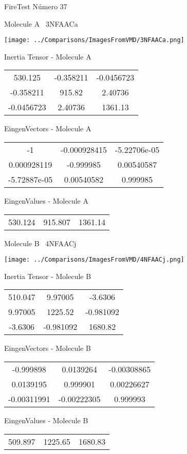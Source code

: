 \vtab[-3cm]
\begin{center}
{\large FireTest \tab Número 37}
\end{center}
\begin{multicols}{2}
\begin{center}

Molecule A \
3NFAACa

\texttt{[image: ../Comparisons/ImagesFromVMD/3NFAACa.png]}

Inertia Tensor - Molecule A \\
\begin{tabular}{|c c c|}
530.125	 & 	-0.358211	 & 	-0.0456723	 \\
-0.358211	 & 	915.82	 & 	2.40736	 \\
-0.0456723	 & 	2.40736	 & 	1361.13
\end{tabular}

\vtab
 EingenVectors - Molecule A     \\
\begin{tabular}{|c c c|}
-1	 & 	-0.000928415	 & 	-5.22706e-05	 \\
0.000928119	 & 	-0.999985	 & 	0.00540587	 \\
-5.72887e-05	 & 	0.00540582	 & 	0.999985
\end{tabular}

\vtab
 EingenValues - Molecule A     \\
\begin{tabular}{|c c c|}
530.124	 & 	915.807	 & 	1361.14	 \\
\end{tabular}
\columnbreak

Molecule B \
4NFAACj

\texttt{[image: ../Comparisons/ImagesFromVMD/4NFAACj.png]}

Inertia Tensor - Molecule B \\
\begin{tabular}{|c c c|}
510.047	 & 	9.97005	 & 	-3.6306	 \\
9.97005	 & 	1225.52	 & 	-0.981092	 \\
-3.6306	 & 	-0.981092	 & 	1680.82
\end{tabular}

\vtab
 EingenVectors - Molecule B     \\
\begin{tabular}{|c c c|}
-0.999898	 & 	0.0139264	 & 	-0.00308865	 \\
0.0139195	 & 	0.999901	 & 	0.00226627	 \\
-0.00311991	 & 	-0.00222305	 & 	0.999993
\end{tabular}

\vtab
 EingenValues - Molecule B     \\
\begin{tabular}{|c c c|}
509.897	 & 	1225.65	 & 	1680.83	 \\
\end{tabular}

\end{center}
\end{multicols}

